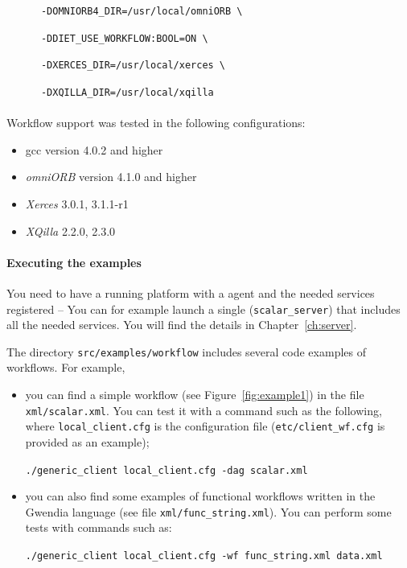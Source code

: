 \begin{itemize}
\verb|      -DOMNIORB4_DIR=/usr/local/omniORB \|

\verb|      -DDIET_USE_WORKFLOW:BOOL=ON \|

\verb|      -DXERCES_DIR=/usr/local/xerces \|

\verb|      -DXQILLA_DIR=/usr/local/xqilla|

\paragraph{}
Workflow support was tested in the following configurations:

\begin{itemize}
\item gcc version 4.0.2 and higher
\item \textit{omniORB} version 4.1.0 and higher
\item \textit{Xerces} 3.0.1, 3.1.1-r1
\item \textit{XQilla} 2.2.0, 2.3.0
\end{itemize}
\end{itemize}

\paragraph{Executing the examples}
\label{sec:wf_examples}

You need to have a running \diet platform with a \madag agent and the needed
services registered -- You can for example launch a single \sed
(\texttt{scalar\_server}) that includes all the needed services. You will find
the details in Chapter~\ref{ch:server}.

The directory \texttt{src/examples/workflow} includes several code examples of
workflows. For example,
\begin{itemize}
\item you can find a simple \DAG workflow (see Figure~\ref{fig:example1}) in
  the file \texttt{xml/scalar.xml}. You can test it with a command such as the
  following, where \texttt{local\_client.cfg} is the \diet configuration file
  (\texttt{etc/client\_wf.cfg} is provided as an example);

\verb|./generic_client local_client.cfg -dag scalar.xml |

\item you can also find some examples of functional workflows written in the
  Gwendia language (see file \texttt{xml/func\_string.xml}). You can perform
  some tests with commands such as:

  \verb|./generic_client local_client.cfg -wf func_string.xml data.xml |

\end{itemize}

